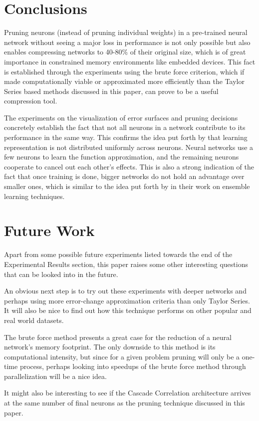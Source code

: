 \section{Conclusions}
Pruning neurons (instead of pruning individual weights) in a pre-trained neural network without seeing a major loss in performance is not only possible but also enables compressing networks to 40-80\% of their original size, which is of great importance in constrained memory environments like embedded devices. This fact is established through the experiments using the brute force criterion, which if made computationally viable or approximated more efficiently than the Taylor Series based methods discussed in this paper, can prove to be a useful compression tool.

The experiments on the visualization of error surfaces and pruning decisions concretely establish the fact that not all neurons in a network contribute to its performance in the same way. This confirms the idea put forth by \cite{mozer1989using} that learning representation is not distributed uniformly across neurons. Neural networks use a few neurons to learn the function approximation, and the remaining neurons cooperate to cancel out each other's effects. This is also a strong indication of the fact that once training is done, bigger networks do not hold an advantage over smaller ones, which is similar to the idea put forth by \cite{darkknowledge2015} in their work on ensemble learning techniques.


\section{Future Work}

Apart from some possible future experiments listed towards the end of the Experimental Results section, this paper raises some other interesting questions that can be looked into in the future.

An obvious next step is to try out these experiments with deeper networks and perhaps using more error-change approximation criteria than only Taylor Series. It will also be nice to find out how this technique performs on other popular and real world datasets.

The brute force method presents a great case for the reduction of a neural network's memory footprint. The only downside to this method is its computational intensity, but since for a given problem pruning will only be a one-time process, perhaps looking into speedups of the brute force method through parallelization will be a nice idea.

It might also be interesting to see if the Cascade Correlation architecture arrives at the same number of final neurons as the pruning technique discussed in this paper.
